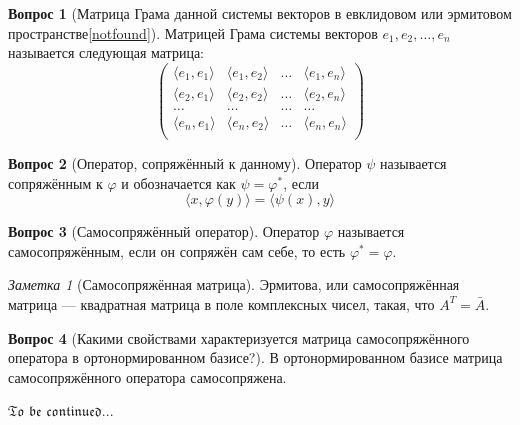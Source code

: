 \documentclass[a4paper,11pt]{article}
\theoremstyle{remark}
\newtheorem*{note}{Заметка}
\theoremstyle{definition}
\newtheorem{question}{Вопрос}
\begin{document}
\begin{question}[Матрица Грама данной системы векторов в евклидовом или эрмитовом пространстве\cref{notfound}]
Матрицей Грама системы векторов \(e_1, e_2, \dots, e_n\) называется следующая матрица:
\begin{equation*}
	\begin{pmatrix}
		\langle e_1, e_1 \rangle & \langle e_1, e_2 \rangle & \dots & \langle e_1, e_n \rangle \\
		\langle e_2, e_1 \rangle & \langle e_2, e_2 \rangle & \dots & \langle e_2, e_n \rangle \\
		\dots & \dots & \dots & \dots \\
		\langle e_n, e_1 \rangle & \langle e_n, e_2 \rangle & \dots & \langle e_n, e_n \rangle \\
	\end{pmatrix}
\end{equation*}
\end{question}





\begin{question}[Оператор, сопряжённый к данному]
Оператор \(\psi\) называется сопряжённым к \(\varphi\) и обозначается как \(\psi = \varphi^*\), если
\begin{equation*}
	\langle x, \varphi(y) \rangle = \langle \psi(x), y \rangle
\end{equation*}
\end{question}


\begin{question}[Самосопряжённый оператор]
Оператор \(\varphi\) называется самосопряжённым, если он сопряжён сам себе, то есть \(\varphi^* = \varphi\).
\end{question}


\begin{note}[Самосопряжённая матрица]
Эрмитова, или самосопряжённая матрица --- квадратная матрица в поле комплексных чисел, такая, что \(A^T = \bar{A}\).
\end{note}


\begin{question}[Какими свойствами характеризуется матрица самосопряжённого оператора в ортонормированном базисе?]
В ортонормированном базисе матрица самосопряжённого оператора самосопряжена.
\end{question}


\Huge
\(\mathfrak{To}\) \(\mathfrak{be}\) \(\mathfrak{continued...}\) 
\end{document}

